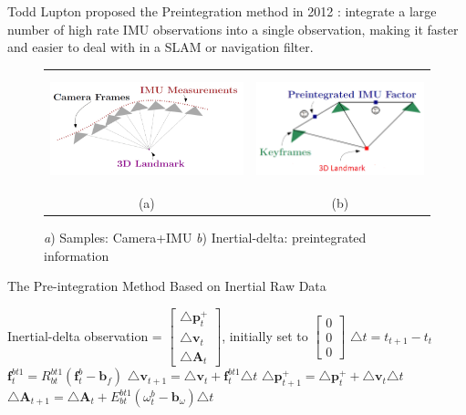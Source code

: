 \documentclass[12pt]{article}   %
\begin{document}
Todd Lupton proposed the Preintegration method in 2012 \cite{Lupton2012}: integrate a large number of high rate IMU observations into a single observation, making it faster and easier to deal with in a SLAM or navigation filter.
\begin{figure}[!ht]
	\begin{center}\begin{tabular}{cc}
			\includegraphics[height=3.3cm]{figures/IMU-sample_Image-frames_3D_illustration.png}&
			\includegraphics[height=3.3cm]{Figures/Preintegrated-IMU_image_3D_illustration.png}\\
			(a) & (b) \\
		\end{tabular}\end{center}
		\caption{\emph{a}) Samples: Camera+IMU \emph{b}) Inertial-delta: preintegrated information \cite{Manifold2015}} 
		\label{fig:VIN sensor information}
	\end{figure} 

\begin{algorithm}
	\caption{The Pre-integration Method Based on Inertial Raw Data}
	\label{algm:preint}		
	\begin{algorithmic}
	\STATE Inertial-delta observation = $\begin{bmatrix} \triangle \textbf{p}_{t}^+ \\ \triangle \textbf{v}_{t} \\ \triangle \textbf{A} _{t} \end{bmatrix}$, initially set to $\begin{bmatrix} 0 \\ 0 \\ 0 \end{bmatrix}$
		\STATE $\triangle t =  t_{t+1} - t_t$ 
		\STATE $\textbf{f}_t^{bt1} = R_{bt}^{bt1} (\textbf{f}_t^b - \textbf{b}_f)$ 
		\STATE $\triangle \textbf{v}_{t+1} = \triangle \textbf{v}_{t} + \textbf{f}_t^{bt1} \triangle t$ 
		\STATE $\triangle \textbf{p}_{t+1}^+ = \triangle \textbf{p}_{t}^+ + \triangle \textbf{v}_t \triangle t$ 
		\STATE $\triangle \textbf{A} _{t+1} = \triangle \textbf{A} _{t} + E_{bt}^{bt1} (\omega _t^b - \textbf{b}_\omega) \triangle t$ 
		\ENDFOR
	\end{algorithmic}
\end{algorithm}
\end{document}
